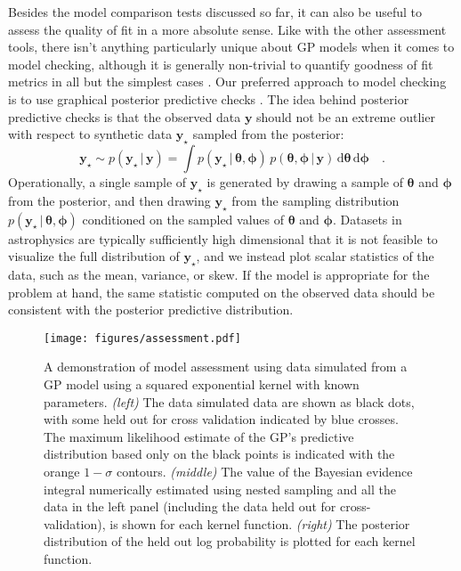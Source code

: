 \documentclass[letterpaper]{ar-1col}
\newcommand{\ydata}{\ensuremath{\boldsymbol{y}}}
\newcommand{\hyperparams}{\ensuremath{\boldsymbol{\phi}}}
\newcommand{\meanparams}{\ensuremath{\boldsymbol{\theta}}}
\begin{document}
Besides the model comparison tests discussed so far, it can also be useful to assess the quality of fit in a more absolute sense.
Like with the other assessment tools, there isn't anything particularly unique about GP models when it comes to model checking, although it is generally non-trivial to quantify goodness of fit metrics in all but the simplest cases \citep[e.g.,][]{gelman1995bayesian}.
Our preferred approach to model checking is to use graphical posterior predictive checks \citep[see][for example]{bayes-workflow}.
The idea behind posterior predictive checks is that the observed data $\ydata$ should not be an extreme outlier with respect to synthetic data $\ydata_\star$ sampled from the posterior:
\begin{equation}
  \ydata_\star \sim p(\ydata_\star\,|\,\ydata) = \int p(\ydata_\star\,|\,\meanparams,\hyperparams)\,p(\meanparams,\hyperparams\,|\,\ydata)\,\mathrm{d}\meanparams\,\mathrm{d}\hyperparams \quad.
\end{equation}
Operationally, a single sample of $\ydata_\star$ is generated by drawing a sample of $\meanparams$ and $\hyperparams$ from the posterior, and then drawing $\ydata_\star$ from the sampling distribution $p(\ydata_\star\,|\,\meanparams,\hyperparams)$ conditioned on the sampled values of $\meanparams$ and $\hyperparams$.
Datasets in astrophysics are typically sufficiently high dimensional that it is not feasible to visualize the full distribution of $\ydata_\star$, and we instead plot scalar statistics of the data, such as the mean, variance, or skew.
If the model is appropriate for the problem at hand, the same statistic computed on the observed data should be consistent with the posterior predictive distribution.

\begin{figure}[ht]
  \centering
  \texttt{[image: figures/assessment.pdf]}
  \caption{A demonstration of model assessment using data simulated from a GP model using a squared exponential kernel with known parameters.
  \emph{(left)} The data simulated data are shown as black dots, with some held out for cross validation indicated by blue crosses.
  The maximum likelihood estimate of the GP's predictive distribution based only on the black points is indicated with the orange $1-\sigma$ contours.
  \emph{(middle)} The value of the Bayesian evidence integral numerically estimated using nested sampling and all the data in the left panel (including the data held out for cross-validation), is shown for each kernel function.
  \emph{(right)} The posterior distribution of the held out log probability is plotted for each kernel function.}
  \label{fig:assessment}
\end{figure}
\end{document}
